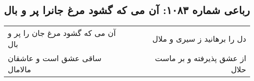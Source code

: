 \begin{center}
\section*{رباعی شماره ۱۰۸۳: آن می که گشود مرغ جانرا پر و بال}
\label{sec:1083}
\begin{longtable}{l p{0.5cm} r}
آن می که گشود مرغ جان را پر و بال
&&
دل را برهانید ز سیری و ملال
\\
ساقی عشق است و عاشقان مالامال
&&
از عشق پذیرفته و بر ماست حلال
\\
\end{longtable}
\end{center}
